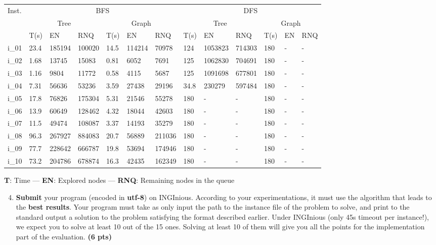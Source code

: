 \documentclass[11pt,a4paper]{report}
\begin{document}
\begin{answers}[7cm]
\small
\begin{center}
\begin{tabular}{||l|l|l|l|l|l|l|l|l|l|l|l|l||}
\hline
\multirow{3}{*}{Inst.} & \multicolumn{6}{c|}{BFS} & \multicolumn{6}{c||}{DFS} \\
\cline{2-13}
& \multicolumn{3}{c|}{Tree} & \multicolumn{3}{c|}{Graph} & \multicolumn{3}{c|}{Tree} & \multicolumn{3}{c||}{Graph}\\
\cline{2-13}
 & T(s) & EN & RNQ & T(s) & EN & RNQ & T(s) & EN & RNQ & T(s) & EN & RNQ\\
\hline
i\_01 & 23.4 & 185194 & 100020 & 14.5 & 114214 & 70978 & 124 & 1053823 & 714303 & 180 & - & - \\
\hline
i\_02 & 1.68 & 13745 & 15083 & 0.81 & 6052 & 7691 & 125 & 1062830 & 704691 & 180 & - & - \\
\hline
i\_03 & 1.16 & 9804 & 11772 & 0.58 & 4115 & 5687 & 125 & 1091698 & 677801 & 180 & - & - \\
\hline
i\_04 & 7.31 & 56636 & 53236 & 3.59 & 27438 & 29196 & 34.8 & 230279 & 597484 & 180 & - & - \\
\hline
i\_05 & 17.8 & 76826 & 175304 & 5.31 & 21546 & 55278 & 180 & - & - & 180 & - & - \\
\hline
i\_06 & 13.9 & 60649 & 128462 & 4.32 & 18044 & 42603 & 180 & - & - & 180 & - & - \\
\hline
i\_07 & 11.5 & 49474 & 108087 & 3.37 & 14193 & 35279 & 180 & - & - & 180 & - & - \\
\hline
i\_08 & 96.3 & 267927 & 884083 & 20.7 & 56889 & 211036 & 180 & - & - & 180 & - & - \\
\hline
i\_09 & 77.7 & 228642 & 666787 & 19.8 & 53694 & 174946 & 180 & - & - & 180 & - & - \\
\hline
i\_10 & 73.2 & 204786 & 678874 & 16.3 & 42435 & 162349 & 180 & - & - & 180 & - & - \\
\hline
\end{tabular}
\end{center}
\textbf{T}: Time — \textbf{EN}: Explored nodes —
\textbf{RNQ}: Remaining nodes in the queue
\end{answers}



\begin{enumerate}
\setcounter{enumi}{3}
    \item\textbf{Submit} your program (encoded in \textbf{utf-8}) on INGInious.
    According to your experimentations, it must use the algorithm that leads to the \textbf{best results}.
    Your program must take as only input the path to the instance file of the problem to solve, and print to the standard output a solution to the problem satisfying the format described earlier. %
    Under INGInious (only 45s timeout per instance!), we expect you to solve at least 10 out of the 15 ones. Solving at least 10 of them will give you all the points for the implementation part of the evaluation. \textbf{(6 pts)}
\end{enumerate}
\end{document}
